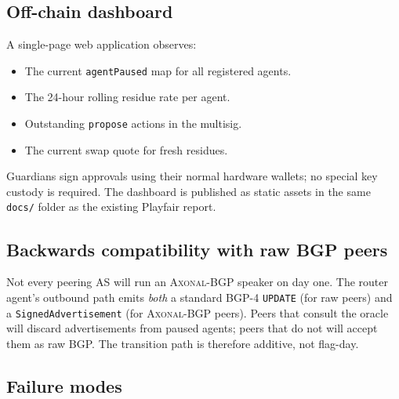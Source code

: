 \documentclass[11pt,twocolumn]{article}
\theoremstyle{definition}
\theoremstyle{plain}
\theoremstyle{remark}
\newcommand{\axonal}{\textsc{Axonal-BGP}}
\newcommand{\code}[1]{\texttt{#1}}
\begin{document}
\subsection{Off-chain dashboard}

A single-page web application observes:
\begin{itemize}[leftmargin=*,itemsep=2pt]
  \item The current \code{agentPaused} map for all registered agents.
  \item The 24-hour rolling residue rate per agent.
  \item Outstanding \code{propose} actions in the multisig.
  \item The current swap quote for fresh residues.
\end{itemize}

\noindent Guardians sign approvals using their normal hardware wallets; no special key custody is required. The dashboard is published as static assets in the same \code{docs/} folder as the existing Playfair report.

\subsection{Backwards compatibility with raw BGP peers}

Not every peering AS will run an \axonal{} speaker on day one. The router agent's outbound path emits \emph{both} a standard BGP-4 \code{UPDATE} (for raw peers) and a \code{SignedAdvertisement} (for \axonal{} peers). Peers that consult the oracle will discard advertisements from paused agents; peers that do not will accept them as raw BGP. The transition path is therefore additive, not flag-day.

\subsection{Failure modes}
\end{document}
